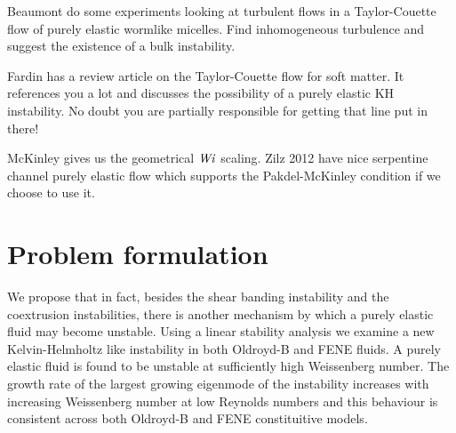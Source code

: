 \documentclass{jfm}
\newcommand\Wi{\mbox{\textit{Wi}}}
\begin{document}
Beaumont \citep{Beaumont2013} do some experiments looking at turbulent flows in
a Taylor-Couette flow of purely elastic wormlike micelles. Find inhomogeneous
turbulence and suggest the existence of a bulk instability.

Fardin \citep{Fardin2014} has a review article on the Taylor-Couette flow for
soft matter. It references you a lot and discusses the possibility of a purely
elastic KH instability. No doubt you are partially responsible for getting that
line put in there!

McKinley \citep{McKinley1996} gives us the geometrical $\Wi$ scaling. Zilz 2012
\citep{Zilz2012} have nice serpentine channel purely elastic flow which
supports the Pakdel-McKinley condition if we choose to use it.

\section{Problem formulation}\label{sec:KH_problem_formulation}

We propose that in fact, besides the shear banding instability and the
coextrusion instabilities, there is another mechanism by which a purely elastic
fluid may become unstable. Using a linear stability analysis we examine a new
Kelvin-Helmholtz like instability in both Oldroyd-B and FENE fluids. A purely
elastic fluid is found to be unstable at sufficiently high Weissenberg number.
The growth rate of the largest growing eigenmode of the instability increases
with increasing Weissenberg number at low Reynolds numbers and this behaviour
is consistent across both Oldroyd-B and FENE constituitive models.
\end{document}
